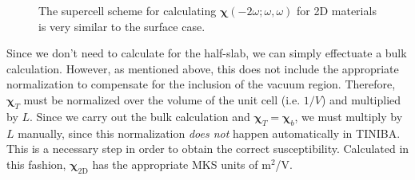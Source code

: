 \documentclass[letterpaper,10pt]{article}
\begin{document}
\begin{figure}[t]
{
\label{fig:2d_supercell}
}
\caption{The supercell scheme for calculating
$\boldsymbol{\chi}(-2\omega;\omega,\omega)$ for 2D materials is very similar to
the surface case.}
\label{fig:2d}
\end{figure}

Since we don't need to calculate for the half-slab, we can simply effectuate a
bulk calculation. However, as mentioned above, this does not include the
appropriate normalization to compensate for the inclusion of the vacuum region.
Therefore, $\boldsymbol{\chi}_{T}$ must be normalized over the volume of the
unit cell (i.e. $1/V$) and multiplied by $L$. Since we carry out the bulk
calculation and $\boldsymbol{\chi}_{T} = \boldsymbol{\chi}_{b}$, we must
multiply by $L$ manually, since this normalization \emph{does not} happen
automatically in TINIBA. This is a necessary step in order to obtain the correct
susceptibility. Calculated in this fashion, $\boldsymbol{\chi}_{\mathrm{2D}}$
has the appropriate MKS units of m$^{2}$/V.



\end{document}
